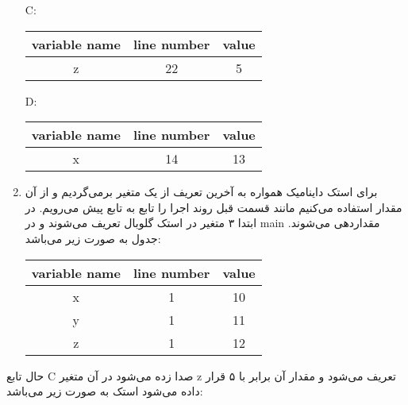 \begin{enumerate}
\begin{center}
\begin{latin}
\begin{tabular}{|c|c|c|}
		\end{tabular}
	\end{latin}
\end{center}
\begin{latin}
	C:
\end{latin}
\begin{center}
	\begin{latin}
		\begin{tabular}{|c|c|c|}
			\hline
			variable name & line number & value\\
			\hline
			z & 22 & 5\\
			\hline
		\end{tabular}
	\end{latin}
\end{center}
\begin{latin}
	D:
\end{latin}
\begin{center}
	\begin{latin}
		\begin{tabular}{|c|c|c|}
			\hline
			variable name & line number & value\\
			\hline
			x & 14 & 13\\
			\hline
			
			
		\end{tabular}
	\end{latin}
\end{center}

	\item
برای استک داینامیک همواره به آخرین تعریف از یک متغیر برمی‌گردیم و از آن مقدار استفاده می‌کنیم مانند قسمت قبل روند اجرا را تابع به تابع پیش می‌رویم. در ابتدا ۳ متغیر در استک گلوبال تعریف می‌شوند و در main مقداردهی می‌شوند. جدول به صورت زیر می‌باشد:
\begin{latin}
	\begin{center}
		\begin{tabular}{|c|c|c|}
			\hline
			variable name & line number & value\\
			\hline
			x & 1 & 10\\
			\hline
			y & 1 & 11\\
			\hline
			z & 1 & 12\\
			\hline
		\end{tabular}
	\end{center}
\end{latin}
\end{enumerate}
حال تابع C صدا زده می‌شود در آن متغیر z تعریف می‌شود و مقدار آن برابر با ۵ قرار داده می‌شود استک به صورت زیر می‌باشد:
